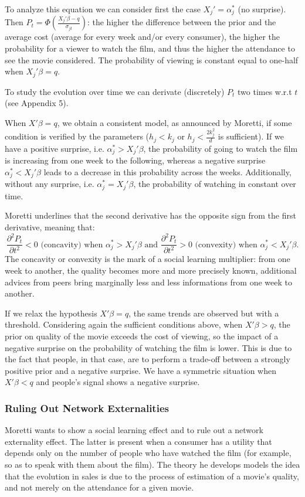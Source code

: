 	To analyze this equation we can consider first the case $X_{j}'=\alpha_{j}^{*}$ (no surprise). Then $P_{t}=\Phi\left(\frac{X_{j}'\beta-q}{\sigma_{j t}}\right)$: the higher the difference between the prior and the average cost (average for every week and/or every consumer), the higher the probability for a viewer to watch the film, and thus the higher the attendance to see the movie considered. The probability of viewing is constant equal to one-half when $X_{j}'\beta=q$.

	To study the evolution over time we can derivate (discretely) $P_{t}$ two times w.r.t $t$ (see Appendix 5).

		When $X'\beta=q$, we obtain a consistent model, as announced by Moretti, if some condition is verified by the parameters ($h_{j}<k_{j}$ or $h_{j}<\frac{2k_{j}^{2}}{d}$ is sufficient).
		If we have a positive surprise, i.e. $\alpha_{j}^{*}>X_{j}'\beta$, the probability of going to watch the film is increasing from one week to the following, whereas a negative surprise $\alpha_{j}^{*}<X_{j}'\beta$ leads to a decrease in this probability across the weeks. Additionally, without any surprise, i.e. $\alpha_{j}^{*}=X_{j}'\beta$, the probability of watching in constant over time.

	Moretti underlines that the second derivative has the opposite sign from the first derivative, meaning that:
	\begin{equation*}
		\frac{\partial ^{2} P_{t}}{\partial t^{2}}<0 \text{ (concavity) when } \alpha_{j}^{*}>X_{j}'\beta \text{ and } \frac{\partial ^{2} P_{t}}{\partial t^{2}}>0 \text{ (convexity) when } \alpha_{j}^{*}<X_{j}'\beta.
	\end{equation*}
	The concavity or convexity is the mark of a social learning multiplier: from one week to another, the quality becomes more and more precisely known, additional advices from peers bring marginally less and less informations from one week to another.

	If we relax the hypothesis $X'\beta=q$, the same trends are observed but with a threshold. Considering again the sufficient conditions above, when $X'\beta>q$, the prior on quality of the movie exceeds the cost of viewing, so the impact of a negative surprise on the probability of watching the film is lower. This is due to the fact that people, in that case, are to perform a trade-off between a strongly positive prior and a negative surprise. We have a symmetric situation when $X'\beta<q$ and people's signal shows a negative surprise.
	
	\subsubsection{Ruling Out Network Externalities}

	Moretti wants to show a social learning effect and to rule out a network externality effect. The latter is present when a consumer has a utility that depends only on the number of people who have watched the film (for example, so as to speak with them about the film). The theory he develops models the idea that the evolution in sales is due to the process of estimation of a movie's quality, and not merely on the attendance for a given movie.
